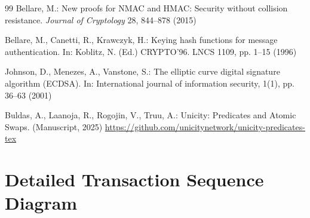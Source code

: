 \documentclass{article}
\begin{document}



\begin{thebibliography}{99}
 Bellare, M.: New proofs for NMAC and HMAC: Security without collision resistance.  \emph{Journal of Cryptology} 28, 844--878 (2015)

Bellare, M., Canetti, R., Krawczyk, H.: Keying hash functions for message authentication.
In: Koblitz, N. (Ed.) CRYPTO’96. LNCS 1109, pp. 1--15 (1996)

Johnson, D., Menezes, A., Vanstone, S.: The elliptic curve digital signature algorithm (ECDSA). In: International journal of information security, 1(1), pp. 36--63 (2001)

Buldas, A., Laanoja, R., Rogojin, V., Truu, A.: Unicity: Predicates and Atomic Swaps. (Manuscript, 2025) {\url{https://github.com/unicitynetwork/unicity-predicates-tex}}


\end{thebibliography}

\pagebreak
\appendix
\section{Detailed Transaction Sequence Diagram}
\end{document}
